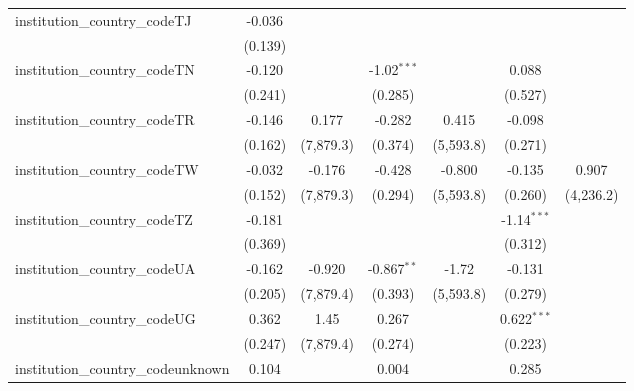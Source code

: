 \begin{tabular}{lcccccc}
   institution\_country\_codeTJ          & -0.036         &               &                &               &                &   \\   
                                         & (0.139)        &               &                &               &                &   \\   
   institution\_country\_codeTN          & -0.120         &               & -1.02$^{***}$  &               & 0.088          &   \\   
                                         & (0.241)        &               & (0.285)        &               & (0.527)        &   \\   
   institution\_country\_codeTR          & -0.146         & 0.177         & -0.282         & 0.415         & -0.098         &   \\   
                                         & (0.162)        & (7,879.3)     & (0.374)        & (5,593.8)     & (0.271)        &   \\   
   institution\_country\_codeTW          & -0.032         & -0.176        & -0.428         & -0.800        & -0.135         & 0.907\\   
                                         & (0.152)        & (7,879.3)     & (0.294)        & (5,593.8)     & (0.260)        & (4,236.2)\\   
   institution\_country\_codeTZ          & -0.181         &               &                &               & -1.14$^{***}$  &   \\   
                                         & (0.369)        &               &                &               & (0.312)        &   \\   
   institution\_country\_codeUA          & -0.162         & -0.920        & -0.867$^{**}$  & -1.72         & -0.131         &   \\   
                                         & (0.205)        & (7,879.4)     & (0.393)        & (5,593.8)     & (0.279)        &   \\   
   institution\_country\_codeUG          & 0.362          & 1.45          & 0.267          &               & 0.622$^{***}$  &   \\   
                                         & (0.247)        & (7,879.4)     & (0.274)        &               & (0.223)        &   \\   
   institution\_country\_codeunknown     & 0.104          &               & 0.004          &               & 0.285          &   \\   

\end{tabular}
